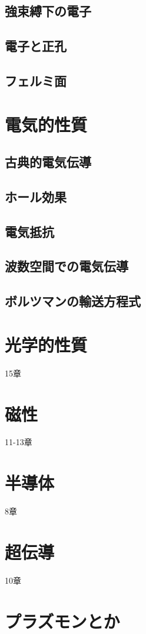 \documentclass[a4paper]{jsreport}
\begin{document}
        \section{強束縛下の電子}

        \section{電子と正孔}

        \section{フェルミ面}

    \chapter{電気的性質}
        \section{古典的電気伝導}
        \section{ホール効果}
        \section{電気抵抗}
        \section{波数空間での電気伝導}
        \section{ボルツマンの輸送方程式}
        
    \chapter{光学的性質}
        15章
    \chapter{磁性}
        11-13章
    \chapter{半導体}
        8章
    \chapter{超伝導}
        10章
    \chapter{プラズモンとか}
            
\end{document}
